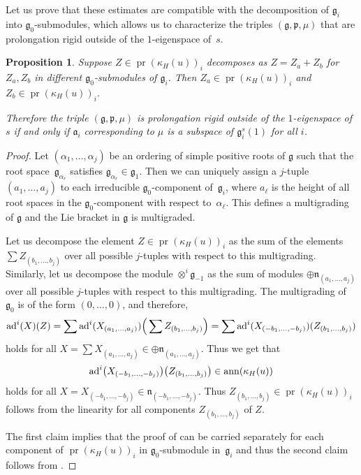 \documentclass[pdftex]{sigma}
\newcommand{\fg}{\mathfrak g}
\newcommand{\fp}{\mathfrak p}
\newcommand{\ad}{{\rm ad}}
\numberwithin{equation}{section}
\newtheorem{Proposition}[Theorem]{Proposition}
 { \theoremstyle{definition}
\newtheorem{Definition}[Theorem]{Definition}
\newtheorem{Example}[Theorem]{Example}
\newtheorem{Remark}[Theorem]{Remark} }
\begin{document}
Let us prove that these estimates are compatible with the decomposition of $\fg_i$ into $\fg_0$-submodules, which allows us to characterize the triples $(\fg,\fp,\mu)$ that are prolongation rigid outside of the $1$-eigenspace of~$s$.

\begin{Proposition} \label{multigrad}
Suppose $Z\in \operatorname{pr}(\kappa_H(u))_i$ decomposes as $Z=Z_a+Z_b$ for $Z_a,Z_b$ in different $\fg_0$-submodules of $\fg_i$. Then $Z_a\in \operatorname{pr}(\kappa_H(u))_i$ and $Z_b\in \operatorname{pr}(\kappa_H(u))_i$.

Therefore the triple $(\fg,\fp,\mu)$ is prolongation rigid outside of the $1$-eigenspace of $s$ if and only if $\mathfrak{a}_i$ corresponding to $\mu$ is a subspace of $\fg_i^s(1)$ for all $i$.
\end{Proposition}
\begin{proof}
Let $(\alpha_1,\dots,\alpha_j)$ be an ordering of simple positive roots of $\fg$ such that the root space~$\fg_{\alpha_r}$ satisf\/ies $\fg_{\alpha_r}\in \fg_1$. Then we can uniquely assign a $j$-tuple $(a_1,\dots,a_j)$ to each irreducible $\fg_0$-component of~$\fg_i$, where $a_\ell$ is the height of all root spaces in the $\fg_0$-component with respect to~$\alpha_\ell$. This def\/ines a multigrading of $\fg$ and the Lie bracket in $\fg$ is multigraded.

Let us decompose the element $Z\in \operatorname{pr}(\kappa_H(u))_i$ as the sum of the elements $\sum Z_{(b_1,\dots,b_j)}$ over all possible $j$-tuples with respect to this multigrading. Similarly, let us decompose the module $\otimes^i \fg_{-1}$ as the sum of modules $\oplus \mathfrak{n}_{(a_1,\dots,a_j)}$ over all possible $j$-tuples with respect to this multigrading.
The multigrading of $\fg_0$ is of the form $(0,\dots, 0)$, and therefore,
\begin{gather*}\ad^i(X)(Z)=\sum \ad^i(X_{(a_1,\dots,a_j)}) \Big(\sum Z_{(b_1,\dots,b_j)}\Big)=\sum \ad^i(X_{(-b_1,\dots,-b_j)}) (Z_{(b_1,\dots,b_j)})\end{gather*}
holds for all $X=\sum X_{(a_1,\dots,a_j)} \in \oplus \mathfrak{n}_{(a_1,\dots,a_j)}$. Thus we get that \begin{gather*}\ad^i\big(X_{(-b_1,\dots,-b_j)}\big) \big(Z_{(b_1,\dots,b_j)}\big)\in \operatorname{ann}(\kappa_H(u))\end{gather*} holds for all $X=X_{(-b_1,\dots,-b_j)}\in \mathfrak{n}_{(-b_1,\dots,-b_j)}$.
Thus $Z_{(b_1,\dots,b_j)}\in \operatorname{pr}(\kappa_H(u))_i$ follows from the linearity for all components $Z_{(b_1,\dots,b_j)}$ of $Z$.

The f\/irst claim implies that the proof of \cite[Proposition~3.1.1]{KT} can be carried separately for each component of $\operatorname{pr}(\kappa_H(u))_i$ in $\fg_0$-submodule in~$\fg_i$ and thus the second claim follows from \cite[Theorem~3.3.3]{KT}.
\end{proof}
\end{document}
